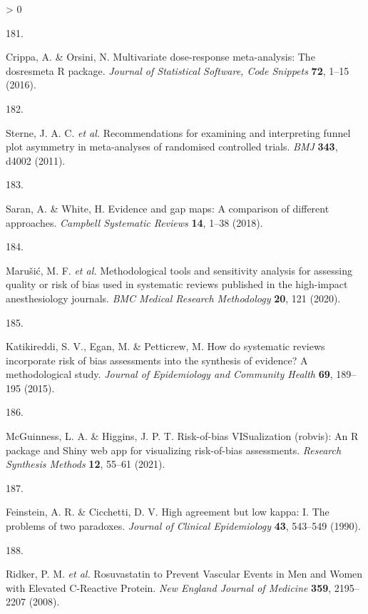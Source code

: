 \documentclass[a4paper, twoside]{templates/ociamthesis}
\newlength{\cslhangindent}
\newlength{\csllabelwidth}
\newenvironment{CSLReferences}[3] %
 {%
  \setlength{\parindent}{0pt}
  \ifodd #1 \everypar{\setlength{\hangindent}{\cslhangindent}}\ignorespaces\fi
  \ifnum #2 > 0
  \setlength{\parskip}{#2\baselineskip}
  \fi
 }%
 {}
\newcommand{\CSLLeftMargin}[1]{\parbox[t]{\maxof{\widthof{#1}}{\csllabelwidth}}{#1}}
\newcommand{\CSLRightInline}[1]{\parbox[t]{\linewidth - \csllabelwidth}{#1}}
\begin{document}
\begin{CSLReferences}{0}{0}
\leavevmode\hypertarget{ref-crippa2016}{}%
\CSLLeftMargin{181. }
\CSLRightInline{Crippa, A. \& Orsini, N. Multivariate dose-response meta-analysis: The dosresmeta {R} package. \emph{Journal of Statistical Software, Code Snippets} \textbf{72}, 1--15 (2016).}

\leavevmode\hypertarget{ref-sterne2011}{}%
\CSLLeftMargin{182. }
\CSLRightInline{Sterne, J. A. C. \emph{et al.} Recommendations for examining and interpreting funnel plot asymmetry in meta-analyses of randomised controlled trials. \emph{BMJ} \textbf{343}, d4002 (2011).}

\leavevmode\hypertarget{ref-saran2018}{}%
\CSLLeftMargin{183. }
\CSLRightInline{Saran, A. \& White, H. Evidence and gap maps: A comparison of different approaches. \emph{Campbell Systematic Reviews} \textbf{14}, 1--38 (2018).}

\leavevmode\hypertarget{ref-marusic2020}{}%
\CSLLeftMargin{184. }
\CSLRightInline{Marušić, M. F. \emph{et al.} Methodological tools and sensitivity analysis for assessing quality or risk of bias used in systematic reviews published in the high-impact anesthesiology journals. \emph{BMC Medical Research Methodology} \textbf{20}, 121 (2020).}

\leavevmode\hypertarget{ref-katikireddi2015}{}%
\CSLLeftMargin{185. }
\CSLRightInline{Katikireddi, S. V., Egan, M. \& Petticrew, M. How do systematic reviews incorporate risk of bias assessments into the synthesis of evidence? A methodological study. \emph{Journal of Epidemiology and Community Health} \textbf{69}, 189--195 (2015).}

\leavevmode\hypertarget{ref-mcguinness2020robvisPaper}{}%
\CSLLeftMargin{186. }
\CSLRightInline{McGuinness, L. A. \& Higgins, J. P. T. Risk-of-bias {VISualization} (robvis): An {R} package and {Shiny} web app for visualizing risk-of-bias assessments. \emph{Research Synthesis Methods} \textbf{12}, 55--61 (2021).}

\leavevmode\hypertarget{ref-feinstein1990}{}%
\CSLLeftMargin{187. }
\CSLRightInline{Feinstein, A. R. \& Cicchetti, D. V. High agreement but low kappa: I. {The} problems of two paradoxes. \emph{Journal of Clinical Epidemiology} \textbf{43}, 543--549 (1990).}

\leavevmode\hypertarget{ref-ridker2008}{}%
\CSLLeftMargin{188. }
\CSLRightInline{Ridker, P. M. \emph{et al.} Rosuvastatin to {Prevent Vascular Events} in {Men} and {Women} with {Elevated C}-{Reactive Protein}. \emph{New England Journal of Medicine} \textbf{359}, 2195--2207 (2008).}


\end{CSLReferences}
\end{document}
